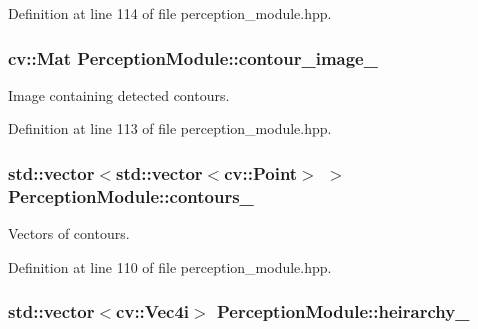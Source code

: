Definition at line 114 of file perception\+\_\+module.\+hpp.

\subsubsection[{\texorpdfstring{contour\+\_\+image\+\_\+}{contour_image_}}]{\setlength{\rightskip}{0pt plus 5cm}cv\+::\+Mat Perception\+Module\+::contour\+\_\+image\+\_\+\hspace{0.3cm}{\ttfamily [private]}}\hypertarget{class_perception_module_a4c6044231fa94975cf299e5cd60ba447}{}\label{class_perception_module_a4c6044231fa94975cf299e5cd60ba447}


Image containing detected contours. 



Definition at line 113 of file perception\+\_\+module.\+hpp.

\subsubsection[{\texorpdfstring{contours\+\_\+}{contours_}}]{\setlength{\rightskip}{0pt plus 5cm}std\+::vector$<$std\+::vector$<$cv\+::\+Point$>$ $>$ Perception\+Module\+::contours\+\_\+\hspace{0.3cm}{\ttfamily [private]}}\hypertarget{class_perception_module_ae611b010af7c0351eb889165198ee82a}{}\label{class_perception_module_ae611b010af7c0351eb889165198ee82a}


Vectors of contours. 



Definition at line 110 of file perception\+\_\+module.\+hpp.

\subsubsection[{\texorpdfstring{heirarchy\+\_\+}{heirarchy_}}]{\setlength{\rightskip}{0pt plus 5cm}std\+::vector$<$cv\+::\+Vec4i$>$ Perception\+Module\+::heirarchy\+\_\+\hspace{0.3cm}{\ttfamily [private]}}\hypertarget{class_perception_module_a1ed5ed9b4c99dd984e76c30f25754282}{}\label{class_perception_module_a1ed5ed9b4c99dd984e76c30f25754282}


